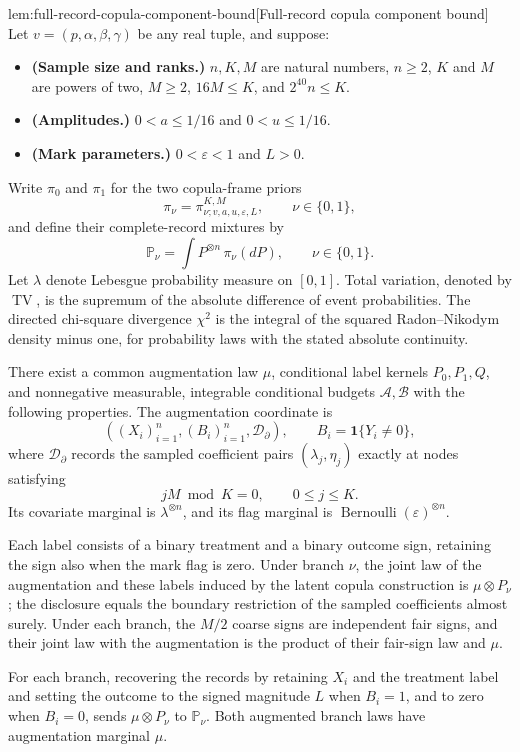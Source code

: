 \begin{lemmav}{lem:full-record-copula-component-bound}[Full-record copula component bound]
Let \(v=(p,\alpha,\beta,\gamma)\) be any real tuple, and suppose:
\begin{itemize}
\item \textbf{(Sample size and ranks.)} \(n,K,M\) are natural numbers, \(n\ge2\), \(K\) and \(M\) are powers of two, \(M\ge2\), \(16M\le K\), and \(2^{40}n\le K\).
\item \textbf{(Amplitudes.)} \(0<a\le1/16\) and \(0<u\le1/16\).
\item \textbf{(Mark parameters.)} \(0<\varepsilon<1\) and \(L>0\).
\end{itemize}
Write \(\pi_0\) and \(\pi_1\) for the two copula-frame priors
\[
\pi_\nu=\pi^{K,M}_{\nu;v,a,u,\varepsilon,L},
\qquad \nu\in\{0,1\},
\]
and define their complete-record mixtures by
\[
\mathbb P_\nu=\int P^{\otimes n}\,\pi_\nu(dP),
\qquad \nu\in\{0,1\}.
\]
Let \(\lambda\) denote Lebesgue probability measure on \([0,1]\). Total variation, denoted by \(\operatorname{TV}\), is the supremum of the absolute difference of event probabilities. The directed chi-square divergence \(\chi^2\) is the integral of the squared Radon--Nikodym density minus one, for probability laws with the stated absolute continuity.

There exist a common augmentation law \(\mu\), conditional label kernels \(P_0,P_1,Q\), and nonnegative measurable, integrable conditional budgets \(\mathcal A,\mathcal B\) with the following properties. The augmentation coordinate is
\[
\left((X_i)_{i=1}^n,(B_i)_{i=1}^n,\mathcal D_{\partial}\right),
\qquad B_i=\mathbf1\{Y_i\ne0\},
\]
where \(\mathcal D_{\partial}\) records the sampled coefficient pairs
\((\lambda_j,\eta_j)\) exactly at nodes satisfying
\[
jM\bmod K=0,\qquad 0\le j\le K.
\]
Its covariate marginal is \(\lambda^{\otimes n}\), and its flag marginal is
\(\operatorname{Bernoulli}(\varepsilon)^{\otimes n}\).

Each label consists of a binary treatment and a binary outcome sign, retaining the sign also when the mark flag is zero. Under branch \(\nu\), the joint law of the augmentation and these labels induced by the latent copula construction is \(\mu\otimes P_\nu\); the disclosure equals the boundary restriction of the sampled coefficients almost surely. Under each branch, the \(M/2\) coarse signs are independent fair signs, and their joint law with the augmentation is the product of their fair-sign law and \(\mu\).

For each branch, recovering the records by retaining \(X_i\) and the treatment label and setting the outcome to the signed magnitude \(L\) when \(B_i=1\), and to zero when \(B_i=0\), sends \(\mu\otimes P_\nu\) to \(\mathbb P_\nu\). Both augmented branch laws have augmentation marginal \(\mu\).


\end{lemmav}
